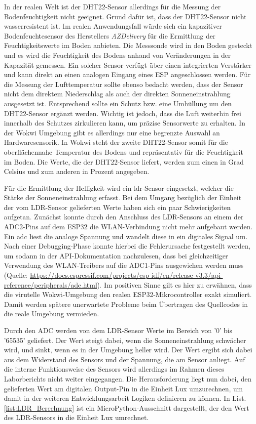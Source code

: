 In der realen Welt ist der DHT22-Sensor allerdings für die Messung der Bodenfeuchtigkeit nicht geeignet. Grund dafür ist, dass der DHT22-Sensor nicht wasserresistent ist. Im realen Anwendungsfall würde sich ein kapazitiver Bodenfeuchtesensor des Herstellers \textit{AZDelivery} für die Ermittlung der Feuchtigkeitswerte im Boden anbieten. Die Messsonde wird in den Boden gesteckt und es wird die Feuchtigkeit des Bodens anhand von Veränderungen in der Kapazität gemessen. Ein solcher Sensor verfügt über einen integrierten Verstärker und kann direkt an einen analogen Eingang eines ESP angeschlossen werden. \newline
Für die Messung der Lufttemperatur sollte ebenso bedacht werden, dass der Sensor nicht dem direktem Niederschlag als auch der direkten Sonneneinstrahlung ausgesetzt ist. Entsprechend sollte ein Schutz bzw. eine Umhüllung um den DHT22-Sensor ergänzt werden. Wichtig ist jedoch, dass die Luft weiterhin frei innerhalb des Schutzes zirkulieren kann, um präzise Sensorwerte zu erhalten.\newline
In der Wokwi Umgebung gibt es allerdings nur eine begrenzte Auswahl an Hardwaresensorik. In Wokwi steht der zweite DHT22-Sensor somit für die oberflächennahe Temperatur des Bodens und repräsentativ für die Feuchtigkeit im Boden. Die Werte, die der DHT22-Sensor liefert, werden zum einen in Grad Celsius und zum anderen in Prozent angegeben.

Für die Ermittlung der Helligkeit wird ein \gls{ldr}-Sensor eingesetzt, welcher die Stärke der Sonneneinstrahlung erfasst. Bei dem Umgang bezüglich der Einheit der vom LDR-Sensor gelieferten Werte haben sich ein paar Schwierigkeiten aufgetan. 
Zunächst konnte durch den Anschluss des LDR-Sensors an einem der ADC2-Pins auf dem ESP32 die WLAN-Verbindung nicht mehr aufgebaut werden. Ein \gls{adc} liest die analoge Spannung und wandelt diese in ein digitales Signal um. 
Nach einer Debugging-Phase konnte hierbei die Fehlerursache festgestellt werden, um sodann in der API-Dokumentation nachzulesen, dass bei gleichzeitiger Verwendung des WLAN-Treibers auf die ADC1-Pins ausgewichen werden muss (Quelle: \url{https://docs.espressif.com/projects/esp-idf/en/release-v3.3/api-reference/peripherals/adc.html}). Im positiven Sinne gilt es hier zu erwähnen, dass die virutelle Wokwi-Umgebung den realen ESP32-Mikrocontroller exakt simuliert. Damit werden spätere unerwartete Probleme beim Übertragen des Quellcodes in die reale Umgebung vermieden.

Durch den ADC werden von dem LDR-Sensor Werte im Bereich von '0' bis '65535' geliefert. Der Wert steigt dabei, wenn die Sonneneinstrahlung schwächer wird, und sinkt, wenn es in der Umgebung heller wird. Der Wert ergibt sich dabei aus dem Widerstand des Sensors und der Spannung, die am Sensor anliegt. Auf die interne Funktionsweise des Sensors wird allerdings im Rahmen dieses Laborberichts nicht weiter eingegangen. Die Herausforderung liegt nun dabei, den gelieferten Wert am digitalen Output-Pin in die Einheit Lux umzurechnen, um damit in der weiteren Entwicklungsarbeit Logiken definieren zu können. In List. \ref{list:LDR_Berechnung} ist ein MicroPython-Ausschnitt dargestellt, der den Wert des LDR-Sensors in die Einheit Lux umrechnet.


